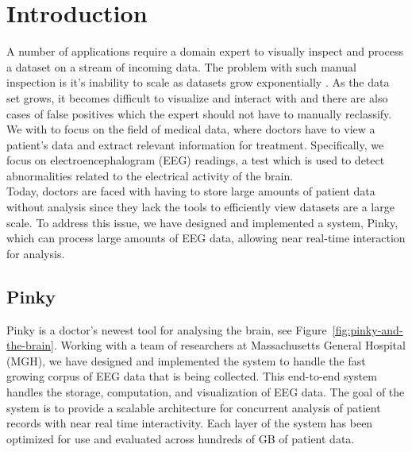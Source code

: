 \chapter{Introduction}\label{intro-ch}

A number of applications require a domain expert to visually inspect and
process a dataset on a stream of incoming data. The problem with such manual
inspection is it's inability to scale as datasets grow exponentially
\cite{exp-growth}. As the data set grows, it becomes difficult to visualize and
interact with \cite{immens} and there are also cases of false positives
which the expert should not have to manually reclassify. We with to focus on
the field of medical data, where doctors have to view a patient's data and
extract relevant information for treatment. Specifically, we focus on
electroencephalogram (EEG) readings, a test which is used to detect
abnormalities related to the electrical activity of the brain. \\

Today, doctors are faced with having to store large amounts of patient data
without analysis since they lack the tools to efficiently view datasets are a
large scale. To address this issue, we have designed and implemented a system,
Pinky, which can process large amounts of EEG data, allowing near real-time
interaction for analysis.


\section{Pinky}

Pinky is a doctor's newest tool for analysing the brain, see
Figure~\ref{fig:pinky-and-the-brain}. Working with a team of researchers at
Massachusetts General Hospital (MGH), we have designed and implemented the
system to handle the fast growing corpus of EEG data that is being collected.
This end-to-end system handles the storage, computation, and visualization of
EEG data.  The goal of the system is to provide a scalable architecture for
concurrent analysis of patient records with near real time interactivity. Each
layer of the system has been optimized for use and evaluated across hundreds of
GB of patient data. \\

